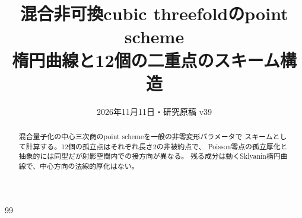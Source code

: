 
\title{混合非可換cubic threefoldのpoint scheme\\
\large 楕円曲線と12個の二重点のスキーム構造}
\author{}\date{2026年11月11日・研究原稿 v39}
\maketitle
\begin{abstract}
混合量子化の中心三次商のpoint schemeを一般の非零変形パラメータで
スキームとして計算する。12個の孤立点はそれぞれ長さ2の非被約点で、
Poisson零点の孤立厚化と抽象的には同型だが射影空間内での接方向が異なる。
残る成分は動くSklyanin楕円曲線で、中心方向の法線的厚化はない。
\end{abstract}

\begin{thebibliography}{99}

\end{thebibliography}
